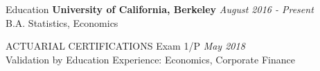 \documentclass{resume} %
\begin{document}

\begin{rSection}{Education}
{\bf University of California, Berkeley} \hfill {\em August 2016 - Present} 
\\ B.A. Statistics, Economics
\end{rSection}

\begin{rSection}{ACTUARIAL CERTIFICATIONS}
Exam 1/P \hfill {\em May 2018} 
\\Validation by Education Experience: Economics, Corporate Finance
\end{rSection}
\end{document}
